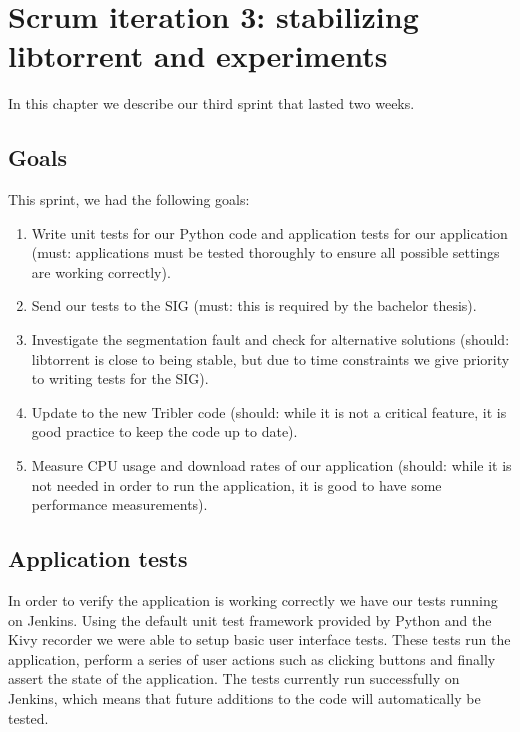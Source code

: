 \chapter{Scrum iteration 3: stabilizing libtorrent and experiments}
\label{cpt:iteration3}
	In this chapter we describe our third sprint that lasted two weeks.

	\section{Goals}
		This sprint, we had the following goals:
	
		\begin{enumerate}
			\item Write unit tests for our Python code and application tests for our application (must: applications must be tested thoroughly to ensure all possible settings are working correctly). 
			\item Send our tests to the SIG (must: this is required by the bachelor thesis).
			\item Investigate the segmentation fault and check for alternative solutions (should: libtorrent is close to being stable, but due to time constraints we give priority to writing tests for the SIG).
			\item Update to the new Tribler code (should: while it is not a critical feature, it is good practice to keep the code up to date).
			\item Measure CPU usage and download rates of our application (should: while it is not needed in order to run the application, it is good to have some performance measurements).
		\end{enumerate}
		
	\section{Application tests}
		In order to verify the application is working correctly we have our tests running on Jenkins. Using the default unit test framework provided by Python and the Kivy recorder we were able to setup basic user interface tests. These tests run the application, perform a series of user actions such as clicking buttons and finally assert the state of the application. The tests currently run successfully on Jenkins, which means that future additions to the code will automatically be tested.
		
